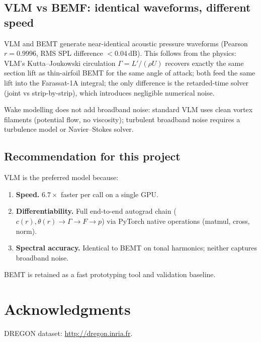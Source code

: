 \documentclass{QD_2026}
\begin{document}
\subsection{VLM vs BEMF: identical waveforms, different speed}
\label{sec:bemt_vs_vlm}
VLM and BEMT generate near-identical acoustic pressure waveforms
(Pearson $r=0.9996$, RMS SPL difference $<0.04\,\mathrm{dB}$).
This follows from the physics: VLM's Kutta--Joukowski circulation
$\Gamma = L'/(\rho U)$ recovers exactly the same section lift as thin-airfoil
BEMT for the same angle of attack; both feed the same lift into the
Farassat-1A integral; the only difference is the retarded-time solver
(joint vs strip-by-strip), which introduces negligible numerical noise.

Wake modelling does not add broadband noise: standard VLM uses clean
vortex filaments (potential flow, no viscosity); turbulent broadband noise
requires a turbulence model or Navier--Stokes solver.

\subsection{Recommendation for this project}
VLM is the preferred model because:
%
\begin{enumerate}
  \item \textbf{Speed.}  $6.7\times$ faster per call on a single GPU.
  \item \textbf{Differentiability.}  Full end-to-end autograd chain
    ($c(r),\theta(r)\to\Gamma\to F\to p$) via PyTorch native operations
    (matmul, cross, norm).
  \item \textbf{Spectral accuracy.}  Identical to BEMT on tonal harmonics;
    neither captures broadband noise.
\end{enumerate}
%
BEMT is retained as a fast prototyping tool and validation baseline.

\section*{Acknowledgments}

DREGON dataset: \url{http://dregon.inria.fr}.



\end{document}

